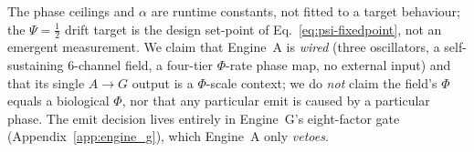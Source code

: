The phase ceilings and $\alpha$ are runtime constants, not fitted to a target
behaviour; the $\Psi=\tfrac12$ drift target is the design set-point of
Eq.~\eqref{eq:psi-fixedpoint}, not an emergent measurement. We claim that
Engine~A is \emph{wired} (three oscillators, a self-sustaining $6$-channel field,
a four-tier $\Phi$-rate phase map, no external input) and that its single
$A\!\rightarrow\!G$ output is a $\Phi$-scale context; we do \emph{not} claim the
field's $\Phi$ equals a biological $\Phi$, nor that any particular emit is caused
by a particular phase. The emit decision lives entirely in Engine~G's eight-factor
gate (Appendix~\ref{app:engine_g}), which Engine~A only \emph{vetoes}.
